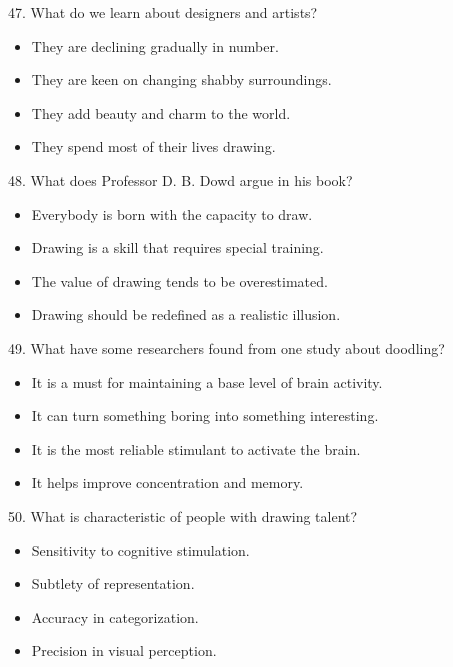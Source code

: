 \documentclass[UTF8,11pt]{ctexart}
\begin{document}
47. What do we learn about designers and artists?


\begin{itemize}[leftmargin=2em,itemsep=.2em,topsep=.4em]\item[A.] They are declining gradually in number.
\item[B.] They are keen on changing shabby surroundings.
\item[C.] They add beauty and charm to the world.
\item[D.] They spend most of their lives drawing.
\end{itemize}

48. What does Professor D. B. Dowd argue in his book?


\begin{itemize}[leftmargin=2em,itemsep=.2em,topsep=.4em]\item[A.] Everybody is born with the capacity to draw.
\item[B.] Drawing is a skill that requires special training.
\item[C.] The value of drawing tends to be overestimated.
\item[D.] Drawing should be redefined as a realistic illusion.
\end{itemize}

49. What have some researchers found from one study about doodling?


\begin{itemize}[leftmargin=2em,itemsep=.2em,topsep=.4em]\item[A.] It is a must for maintaining a base level of brain activity.
\item[B.] It can turn something boring into something interesting.
\item[C.] It is the most reliable stimulant to activate the brain.
\item[D.] It helps improve concentration and memory.
\end{itemize}

50. What is characteristic of people with drawing talent?


\begin{itemize}[leftmargin=2em,itemsep=.2em,topsep=.4em]\item[A.] Sensitivity to cognitive stimulation.
\item[B.] Subtlety of representation.
\item[C.] Accuracy in categorization.
\item[D.] Precision in visual perception.
\end{itemize}
\end{document}
